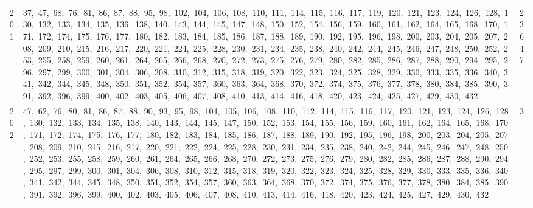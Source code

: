 \begin{longtable}{c|p{}|r}
201 & 37,\ 47,\ 68,\ 76,\ 81,\ 86,\ 87,\ 88,\ 95,\ 98,\ 102,\ 104,\ 106,\ 108,\ 110,\ 111,\ 114,\ 115,\ 116,\ 117,\ 119,\ 120,\ 121,\ 123,\ 124,\ 126,\ 128,\ 130,\ 132,\ 133,\ 134,\ 135,\ 136,\ 138,\ 140,\ 143,\ 144,\ 145,\ 147,\ 148,\ 150,\ 152,\ 154,\ 156,\ 159,\ 160,\ 161,\ 162,\ 164,\ 165,\ 168,\ 170,\ 171,\ 172,\ 174,\ 175,\ 176,\ 177,\ 180,\ 182,\ 183,\ 184,\ 185,\ 186,\ 187,\ 188,\ 189,\ 190,\ 192,\ 195,\ 196,\ 198,\ 200,\ 203,\ 204,\ 205,\ 207,\ 208,\ 209,\ 210,\ 215,\ 216,\ 217,\ 220,\ 221,\ 224,\ 225,\ 228,\ 230,\ 231,\ 234,\ 235,\ 238,\ 240,\ 242,\ 244,\ 245,\ 246,\ 247,\ 248,\ 250,\ 252,\ 253,\ 255,\ 258,\ 259,\ 260,\ 261,\ 264,\ 265,\ 266,\ 268,\ 270,\ 272,\ 273,\ 275,\ 276,\ 279,\ 280,\ 282,\ 285,\ 286,\ 287,\ 288,\ 290,\ 294,\ 295,\ 296,\ 297,\ 299,\ 300,\ 301,\ 304,\ 306,\ 308,\ 310,\ 312,\ 315,\ 318,\ 319,\ 320,\ 322,\ 323,\ 324,\ 325,\ 328,\ 329,\ 330,\ 333,\ 335,\ 336,\ 340,\ 341,\ 342,\ 344,\ 345,\ 348,\ 350,\ 351,\ 352,\ 354,\ 357,\ 360,\ 363,\ 364,\ 368,\ 370,\ 372,\ 374,\ 375,\ 376,\ 377,\ 378,\ 380,\ 384,\ 385,\ 390,\ 391,\ 392,\ 396,\ 399,\ 400,\ 402,\ 403,\ 405,\ 406,\ 407,\ 408,\ 410,\ 413,\ 414,\ 416,\ 418,\ 420,\ 423,\ 424,\ 425,\ 427,\ 429,\ 430,\ 432 & 23647 \\
202 & 47,\ 62,\ 76,\ 80,\ 81,\ 86,\ 87,\ 88,\ 90,\ 93,\ 95,\ 98,\ 104,\ 105,\ 106,\ 108,\ 110,\ 112,\ 114,\ 115,\ 116,\ 117,\ 120,\ 121,\ 123,\ 124,\ 126,\ 128,\ 130,\ 132,\ 133,\ 134,\ 135,\ 138,\ 140,\ 143,\ 144,\ 145,\ 147,\ 150,\ 152,\ 153,\ 154,\ 155,\ 156,\ 159,\ 160,\ 161,\ 162,\ 164,\ 165,\ 168,\ 170,\ 171,\ 172,\ 174,\ 175,\ 176,\ 177,\ 180,\ 182,\ 183,\ 184,\ 185,\ 186,\ 187,\ 188,\ 189,\ 190,\ 192,\ 195,\ 196,\ 198,\ 200,\ 203,\ 204,\ 205,\ 207,\ 208,\ 209,\ 210,\ 215,\ 216,\ 217,\ 220,\ 221,\ 222,\ 224,\ 225,\ 228,\ 230,\ 231,\ 234,\ 235,\ 238,\ 240,\ 242,\ 244,\ 245,\ 246,\ 247,\ 248,\ 250,\ 252,\ 253,\ 255,\ 258,\ 259,\ 260,\ 261,\ 264,\ 265,\ 266,\ 268,\ 270,\ 272,\ 273,\ 275,\ 276,\ 279,\ 280,\ 282,\ 285,\ 286,\ 287,\ 288,\ 290,\ 294,\ 295,\ 297,\ 299,\ 300,\ 301,\ 304,\ 306,\ 308,\ 310,\ 312,\ 315,\ 318,\ 319,\ 320,\ 322,\ 323,\ 324,\ 325,\ 328,\ 329,\ 330,\ 333,\ 335,\ 336,\ 340,\ 341,\ 342,\ 344,\ 345,\ 348,\ 350,\ 351,\ 352,\ 354,\ 357,\ 360,\ 363,\ 364,\ 368,\ 370,\ 372,\ 374,\ 375,\ 376,\ 377,\ 378,\ 380,\ 384,\ 385,\ 390,\ 391,\ 392,\ 396,\ 399,\ 400,\ 402,\ 403,\ 405,\ 406,\ 407,\ 408,\ 410,\ 413,\ 414,\ 416,\ 418,\ 420,\ 423,\ 424,\ 425,\ 427,\ 429,\ 430,\ 432 & 3 \\

\end{longtable}

